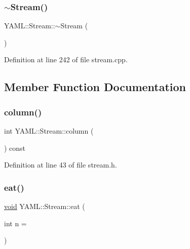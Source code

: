 \mbox{\label{class_y_a_m_l_1_1_stream_a3d32d1c9e0091000a21494379d2812c7}} 
\subsubsection{\texorpdfstring{$\sim$Stream()}{~Stream()}}
{\footnotesize\ttfamily Y\+A\+M\+L\+::\+Stream\+::$\sim$\+Stream (\begin{DoxyParamCaption}{ }\end{DoxyParamCaption})}



Definition at line 242 of file stream.\+cpp.



\subsection{Member Function Documentation}
\mbox{\label{class_y_a_m_l_1_1_stream_a5bf908c973c4ca1969e69c051ba8a33f}} 
\subsubsection{\texorpdfstring{column()}{column()}}
{\footnotesize\ttfamily int Y\+A\+M\+L\+::\+Stream\+::column (\begin{DoxyParamCaption}{ }\end{DoxyParamCaption}) const\hspace{0.3cm}{\ttfamily [inline]}}



Definition at line 43 of file stream.\+h.

\mbox{\label{class_y_a_m_l_1_1_stream_ac79171e6d96a34e9edde03edbc6c3e2e}} 
\subsubsection{\texorpdfstring{eat()}{eat()}}
{\footnotesize\ttfamily \mbox{\hyperlink{glad_8h_a950fc91edb4504f62f1c577bf4727c29}{void}} Y\+A\+M\+L\+::\+Stream\+::eat (\begin{DoxyParamCaption}\item[{int}]{n = {} }\end{DoxyParamCaption})}



